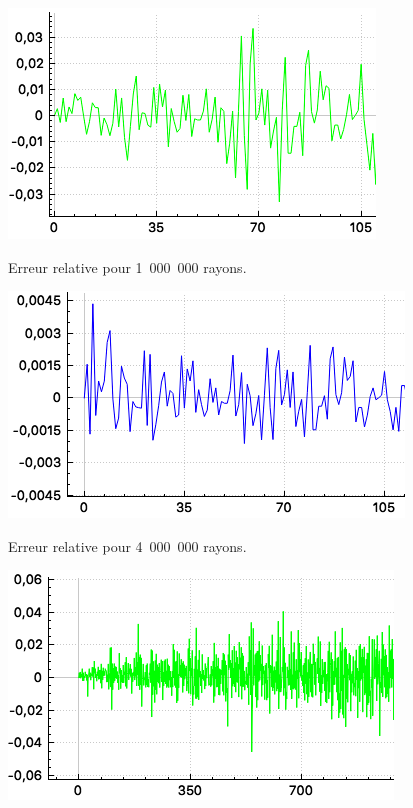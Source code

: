 \begin{figureth}
	\begin{subfigureth}{0.49\textwidth}
		\includegraphics[width=\linewidth]{images/test3_1}
		\caption{Erreur relative pour 1~000~000 rayons.}
		\label{test3_1}
	\end{subfigureth}
	\begin{subfigureth}{0.49\textwidth}
		\includegraphics[width=\linewidth]{images/test3_2}
		\caption{Erreur relative pour 4~000~000 rayons.}
		\label{test3_2}
	\end{subfigureth}
	\par\vspace{0.5cm}
	\begin{subfigureth}{0.49\textwidth}
		\includegraphics[width=\linewidth]{images/test3_3}

\end{subfigureth}
\end{figureth}
